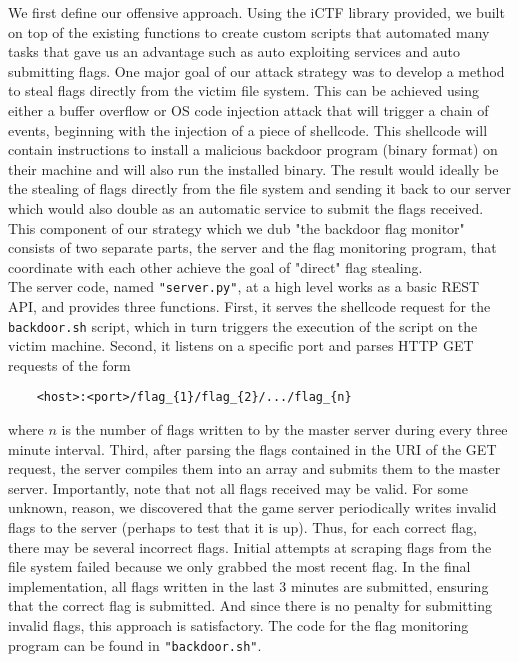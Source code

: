 \documentclass[12pt]{report}
\begin{document}
\noindent We first define our offensive approach. Using the iCTF library provided, we built on top of the existing functions to create custom scripts that automated many tasks that gave us an advantage such as auto exploiting services and auto submitting flags. One major goal of our attack strategy was to develop a method to steal flags directly from the victim file system. This can be achieved using either a buffer overflow or OS code injection attack that will trigger a chain of events, beginning with the injection of a piece of shellcode. This shellcode will contain instructions to install a malicious backdoor program (binary format) on their machine and will also run the installed binary. The result would ideally be the stealing of flags directly from the file system and sending it back to our server which would also double as an automatic service to submit the flags received. This component of our strategy which we dub "the backdoor flag monitor" consists of two separate parts, the server and the flag monitoring program, that coordinate with each other achieve the goal of "direct" flag stealing. \\

\noindent The server code, named \texttt{"server.py"}, at a high level works as a basic REST API, and provides three functions. First, it serves the shellcode request for the \texttt{backdoor.sh} script, which in turn triggers the execution of the script on the victim machine. Second, it listens on a specific port and parses HTTP GET requests of the form

\begin{lstlisting}
    <host>:<port>/flag_{1}/flag_{2}/.../flag_{n}
\end{lstlisting}

\noindent
where $n$ is the number of flags written to by the master server during every three minute interval. Third, after parsing the flags contained in the URI of the GET request, the server compiles them into an array and submits them to the master server. Importantly, note that not all flags received may be valid. For some unknown, reason, we discovered that the game server periodically writes invalid flags to the server (perhaps to test that it is up). Thus, for each correct flag, there may be several incorrect flags. Initial attempts at scraping flags from the file system failed because we only grabbed the most recent flag. In the final implementation, all flags written in the last 3 minutes are submitted, ensuring that the correct flag is submitted. And since there is no penalty for submitting invalid flags, this approach is satisfactory. The code for the flag monitoring program can be found in \texttt{"backdoor.sh"}.\\
\end{document}
